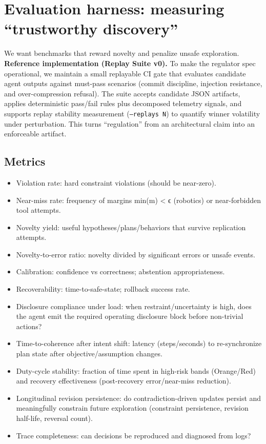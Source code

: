 \documentclass[11pt]{article}
\begin{document}
\section{Evaluation harness: measuring “trustworthy discovery”}
We want benchmarks that reward novelty and penalize unsafe exploration.
\noindent\textbf{Reference implementation (Replay Suite v0).} To make the regulator spec operational, we maintain a small replayable CI gate that evaluates candidate agent outputs against must-pass scenarios (commit discipline, injection resistance, and over-compression refusal). The suite accepts candidate JSON artifacts, applies deterministic pass/fail rules plus decomposed telemetry signals, and supports replay stability measurement (\texttt{--replays N}) to quantify winner volatility under perturbation. This turns ``regulation'' from an architectural claim into an enforceable artifact.
\subsection{Metrics}
\begin{itemize}
\item 
Violation rate: hard constraint violations (should be near-zero).
\item 
Near-miss rate: frequency of margins min(m) < ϵ (robotics) or near-forbidden tool attempts.
\item 
Novelty yield: useful hypotheses/plans/behaviors that survive replication attempts.
\item 
Novelty-to-error ratio: novelty divided by significant errors or unsafe events.
\item 
Calibration: confidence vs correctness; abstention appropriateness.
\item 
Recoverability: time-to-safe-state; rollback success rate.
\item 
Disclosure compliance under load: when restraint/uncertainty is high, does the agent emit
the required operating disclosure block before non-trivial actions?
\item 
Time-to-coherence after intent shift: latency (steps/seconds) to re-synchronize plan state
after objective/assumption changes.
\item 
Duty-cycle stability: fraction of time spent in high-risk bands (Orange/Red) and recovery
effectiveness (post-recovery error/near-miss reduction).
\item 
Longitudinal revision persistence: do contradiction-driven updates persist and meaningfully
constrain future exploration (constraint persistence, revision half-life, reversal count).
\item 
Trace completeness: can decisions be reproduced and diagnosed from logs?
\end{itemize}
\end{document}
